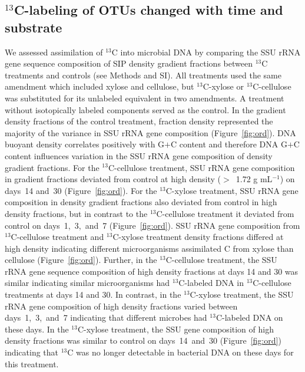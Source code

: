 \subsection{$^{13}$C-labeling of OTUs changed with time and substrate}
We assessed assimilation of $^{13}$C into microbial DNA by comparing the SSU
rRNA gene sequence composition of SIP density gradient fractions between
$^{13}$C treatments and controls (see Methods and SI). All treatments used the
same amendment which included xylose and cellulose, but $^{13}$C-xylose or
$^{13}$C-cellulose was substituted for its unlabeled equivalent in two
amendments. A treatment without isotopically labeled components served as the
control. In the gradient density fractions of the control treatment,
fraction density represented the majority of the variance in SSU rRNA gene
composition (Figure~\ref{fig:ord}). DNA buoyant density correlates positively
with G$+$C content \citep{Buckley_2007} and therefore DNA G$+$C content
influences variation in the SSU rRNA gene composition of density gradient
fractions. For the $^{13}$C-cellulose treatment, SSU rRNA gene composition in
gradient fractions deviated from control at high density ($>$~1.72 g mL$^{-1}$)
on days~14 and~30 (Figure~\ref{fig:ord}). For the $^{13}$C-xylose treatment,
SSU rRNA gene composition in density gradient fractions also deviated from
control in high density fractions, but in contrast to the $^{13}$C-cellulose
treatment it deviated from control on days~1,~3,~and~7 (Figure~\ref{fig:ord}).
SSU rRNA gene composition from $^{13}$C-cellulose treatment and $^{13}$C-xylose
treatment density fractions differed at high density indicating different
microorganisms assimilated C from xylose than cellulose (Figure~\ref{fig:ord}).
Further, in the $^{13}$C-cellulose treatment, the SSU rRNA gene sequence
composition of high density fractions at days 14 and 30 was similar indicating
similar microorganisms had $^{13}$C-labeled DNA in $^{13}$C-cellulose
treatments at days 14 and 30. In contrast, in the $^{13}$C-xylose treatment,
the SSU rRNA gene composition of high density fractions varied between
days~1,~3,~and~7 indicating that different microbes had $^{13}$C-labeled DNA on
these days. In the $^{13}$C-xylose treatment, the SSU gene composition of high
density fractions was similar to control on days~14~and~30
(Figure~\ref{fig:ord}) indicating that $^{13}$C was no longer detectable in
bacterial DNA on these days for this treatment. 

